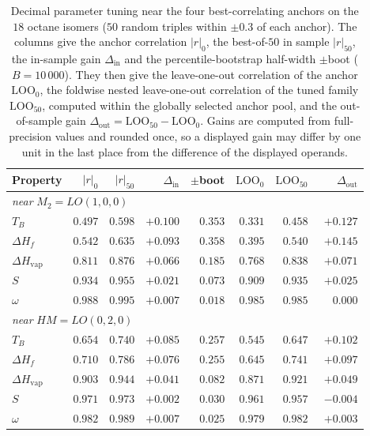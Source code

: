 \documentclass[a5paper, 10pt]{article}
\theoremstyle{plain}
\theoremstyle{remark}
\theoremstyle{definition}
\begin{document}
\begin{table}[H]
\centering
\caption{Decimal parameter tuning near the four best-correlating anchors on the $18$ octane isomers ($50$ random triples within $\pm 0.3$ of each anchor). The columns give the anchor correlation $|r|_0$, the best-of-$50$ in sample $|r|_{50}$, the in-sample gain $\Delta_{\mathrm{in}}$ and the percentile-bootstrap half-width $\pm$boot ($B = 10\,000$). They then give the leave-one-out correlation of the anchor $\mathrm{LOO}_0$, the foldwise nested leave-one-out correlation of the tuned family $\mathrm{LOO}_{50}$, computed within the globally selected anchor pool, and the out-of-sample gain $\Delta_{\mathrm{out}} = \mathrm{LOO}_{50} - \mathrm{LOO}_0$. Gains are computed from full-precision values and rounded once, so a displayed gain may differ by one unit in the last place from the difference of the displayed operands.}
\label{tab:lo_tuning}
\scriptsize
\setlength{\tabcolsep}{4pt}
\begin{tabular}{lrrrrrrr}
\toprule
Property & $|r|_0$ & $|r|_{50}$ & $\Delta_{\mathrm{in}}$ & $\pm$boot & $\mathrm{LOO}_0$ & $\mathrm{LOO}_{50}$ & $\Delta_{\mathrm{out}}$\\
\midrule
\multicolumn{8}{l}{\emph{near} $M_2 = LO(1,0,0)$}\\
$T_B$ & $0.497$ & $0.598$ & $+0.100$ & $0.353$ & $0.331$ & $0.458$ & $+0.127$\\
$\Delta H_f$ & $0.542$ & $0.635$ & $+0.093$ & $0.358$ & $0.395$ & $0.540$ & $+0.145$\\
$\Delta H_{\mathrm{vap}}$ & $0.811$ & $0.876$ & $+0.066$ & $0.185$ & $0.768$ & $0.838$ & $+0.071$\\
$S$ & $0.934$ & $0.955$ & $+0.021$ & $0.073$ & $0.909$ & $0.935$ & $+0.025$\\
$\omega$ & $0.988$ & $0.995$ & $+0.007$ & $0.018$ & $0.985$ & $0.985$ & $\phantom{+}0.000$\\
\midrule
\multicolumn{8}{l}{\emph{near} $HM = LO(0,2,0)$}\\
$T_B$ & $0.654$ & $0.740$ & $+0.085$ & $0.257$ & $0.545$ & $0.647$ & $+0.102$\\
$\Delta H_f$ & $0.710$ & $0.786$ & $+0.076$ & $0.255$ & $0.645$ & $0.741$ & $+0.097$\\
$\Delta H_{\mathrm{vap}}$ & $0.903$ & $0.944$ & $+0.041$ & $0.082$ & $0.871$ & $0.921$ & $+0.049$\\
$S$ & $0.971$ & $0.973$ & $+0.002$ & $0.030$ & $0.961$ & $0.957$ & $-0.004$\\
$\omega$ & $0.982$ & $0.989$ & $+0.007$ & $0.025$ & $0.979$ & $0.982$ & $+0.003$\\

\end{tabular}
\end{table}
\end{document}
